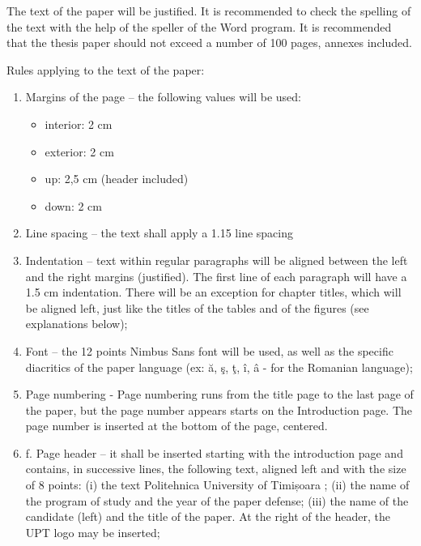 The text of the paper will be justified. It is recommended to check the spelling of the text with the help of the speller of the Word program. It is recommended that the thesis paper should not exceed a number of 100 pages, annexes included.


Rules applying to the text of the paper:
\begin{enumerate}[leftmargin=2cm,topsep=1.15pt,itemsep=1.15pt,partopsep=1.15pt,parsep=1.15pt,label=\alph*.]
   \item Margins of the page – the following values will be used:
   \begin{itemize}[topsep=1.15pt,itemsep=1.15pt,partopsep=1.15pt,parsep=1.15pt]
     \item interior: 2 cm 
     \item exterior: 2 cm 
     \item up: 2,5 cm (header included)
     \item down: 2 cm
   \end{itemize}
   \item Line spacing – the text shall apply a 1.15 line spacing 
   \item Indentation – text within regular paragraphs will be aligned between the left and the right margins (justified). The first line of each paragraph will have a 1.5 cm indentation. There will be an exception for chapter titles, which will be aligned left, just like the titles of the tables and of the figures (see explanations below);
   \item Font – the 12 points Nimbus Sans font will be used, as well as the specific diacritics of the paper language (ex: ă, ş, ţ, î, â - for the Romanian language);
   \item Page numbering -  Page numbering runs from the title page to the last page of the paper, but the page number appears starts on the Introduction page. The page number is inserted at the bottom of the page, centered.
   \item f.	Page header – it shall be inserted starting with the introduction page and contains, in successive lines, the following text, aligned left and with the size of 8 points: (i) the text Politehnica University of Timișoara ; (ii) the name of the program of study and the year of the paper defense; (iii) the name of the candidate (left) and the title of the paper. At the right of the header, the UPT logo may be inserted; 
\end{enumerate}
